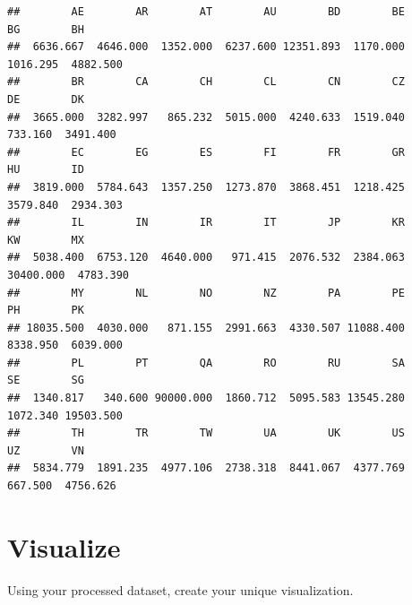 \documentclass[]{article}
\newenvironment{Shaded}{\begin{snugshade}}{\end{snugshade}}
\newcommand{\DataTypeTok}[1]{\textcolor[rgb]{0.13,0.29,0.53}{#1}}
\newcommand{\DecValTok}[1]{\textcolor[rgb]{0.00,0.00,0.81}{#1}}
\newcommand{\KeywordTok}[1]{\textcolor[rgb]{0.13,0.29,0.53}{\textbf{#1}}}
\newcommand{\NormalTok}[1]{#1}
\newcommand{\OperatorTok}[1]{\textcolor[rgb]{0.81,0.36,0.00}{\textbf{#1}}}
\newcommand{\OtherTok}[1]{\textcolor[rgb]{0.56,0.35,0.01}{#1}}
\newcommand{\StringTok}[1]{\textcolor[rgb]{0.31,0.60,0.02}{#1}}
\begin{document}
\begin{verbatim}
##        AE        AR        AT        AU        BD        BE        BG        BH 
##  6636.667  4646.000  1352.000  6237.600 12351.893  1170.000  1016.295  4882.500 
##        BR        CA        CH        CL        CN        CZ        DE        DK 
##  3665.000  3282.997   865.232  5015.000  4240.633  1519.040   733.160  3491.400 
##        EC        EG        ES        FI        FR        GR        HU        ID 
##  3819.000  5784.643  1357.250  1273.870  3868.451  1218.425  3579.840  2934.303 
##        IL        IN        IR        IT        JP        KR        KW        MX 
##  5038.400  6753.120  4640.000   971.415  2076.532  2384.063 30400.000  4783.390 
##        MY        NL        NO        NZ        PA        PE        PH        PK 
## 18035.500  4030.000   871.155  2991.663  4330.507 11088.400  8338.950  6039.000 
##        PL        PT        QA        RO        RU        SA        SE        SG 
##  1340.817   340.600 90000.000  1860.712  5095.583 13545.280  1072.340 19503.500 
##        TH        TR        TW        UA        UK        US        UZ        VN 
##  5834.779  1891.235  4977.106  2738.318  8441.067  4377.769   667.500  4756.626
\end{verbatim}

\hypertarget{visualize}{%
\section{Visualize}\label{visualize}}

Using your processed dataset, create your unique visualization.

\begin{Shaded}
\end{Shaded}
\end{document}
